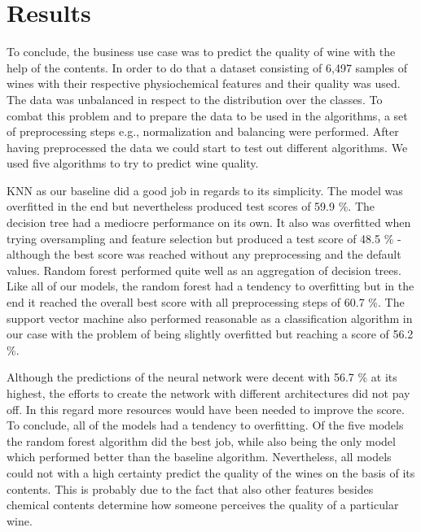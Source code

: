 \chapter{Results}
To conclude, the business use case was to predict the quality of wine with the help of the contents. In order to do that a dataset consisting of 6,497 samples of wines with their respective physiochemical features and their quality was used. The data was unbalanced in respect to the distribution over the classes. To combat this problem and to prepare the data to be used in the algorithms, a set of preprocessing steps e.g., normalization and balancing were performed. After having preprocessed the data we could start to test out different algorithms. We used five algorithms to try to predict wine quality. 

KNN as our baseline did a good job in regards to its simplicity. The model was overfitted in the end but nevertheless produced test scores of 59.9 \%. The decision tree had a mediocre performance on its own. It also was overfitted when trying oversampling and feature selection but produced a test score of 48.5 \% - although the best score was reached without any preprocessing and the default values. Random forest performed quite well as an aggregation of decision trees. Like all of our models, the random forest had a tendency to overfitting but in the end it reached the overall best score with all preprocessing steps of 60.7 \%. The support vector machine also performed reasonable as a classification algorithm in our case with the problem of being slightly overfitted but reaching a score of 56.2 \%.

Although the predictions of the neural network were decent with 56.7 \% at its highest, the efforts to create the network with different architectures did not pay off. In this regard more resources would have been needed to improve the score. To conclude, all of the models had a tendency to overfitting.
Of the five models the random forest algorithm did the best job, while also being the only model which performed better than the baseline algorithm.
Nevertheless, all models could not with a high certainty predict the quality of the wines on the basis of its contents. This is probably due to the fact that also other features besides chemical contents determine how someone perceives the quality of a particular wine.
